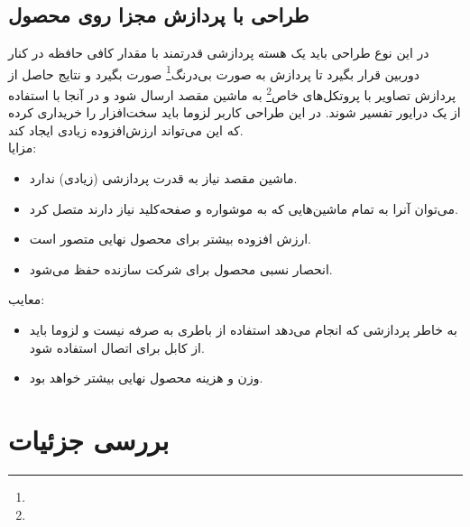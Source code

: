 \documentclass{article}
\begin{document}
\subsection{طراحی با پردازش مجزا روی محصول}
در این نوع طراحی باید یک هسته پردازشی قدرتمند با مقدار کافی حافظه در کنار 
دوربین قرار بگیرد تا پردازش به صورت بی‌درنگ\footnote{} صورت بگیرد و نتایج حاصل از پردازش تصاویر با پروتکل‌های خاص\footnote{} به ماشین مقصد ارسال شود و در آنجا با استفاده از یک درایور تفسیر شوند. در این طراحی کاربر لزوما باید سخت‌افزار را خریداری کرده که این می‌تواند ارزش‌افزوده زیادی ایجاد کند. \\
	مزایا:
	\begin{itemize}
		\item ماشین مقصد نیاز به قدرت پردازشی (زیادی) ندارد.
		\item می‌توان آنرا به تمام ماشین‌هایی که به موشواره و صفحه‌کلید نیاز دارند متصل کرد.
		\item ارزش‌ افزوده بیشتر برای محصول نهایی متصور است.
		\item انحصار نسبی محصول برای شرکت سازنده حفظ می‌شود.
	\end{itemize}
	معایب:
	\begin{itemize}
		\item به خاطر پردازشی که انجام می‌دهد استفاده از باطری‌ به صرفه نیست و لزوما باید از کابل برای اتصال استفاده شود.
		\item وزن و هزینه محصول نهایی بیشتر خواهد بود.
	\end{itemize}

\section{بررسی جزئیات}
\end{document}
